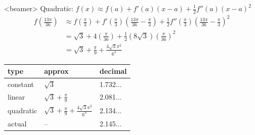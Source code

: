 \begin{frame}<beamer>
\color{answercolor}
Quadratic: $f(x) \approx f(a)+f'(a)(x-a)+\frac12f''(a)(x-a)^2$
\begin{align*}
f\left( \frac{13\pi}{36}\right) &\approx f\left( \frac{\pi}{3}\right)
     +f'\left( \frac{\pi}{3}\right)\left( \frac{13\pi}{36}- \frac{\pi}{3}\right)
+\frac12f''\left( \frac{\pi}{3}\right)\left( \frac{13\pi}{36}- \frac{\pi}{3}\right)^2\\
&=\sqrt 3+4\left(\frac{\pi}{36}\right) +\frac12(8\sqrt 3)\left(\frac{\pi}{36}\right)^2\\
&=\sqrt 3 +\frac{\pi}{9}+\frac{4\sqrt 3 \pi^2}{6^4}
\end{align*}
\begin{center}
\begin{tabular}{l|l|l}
type & approx & decimal \\ \hline
constant & $\sqrt 3$ & 1.732...\\
linear & $\sqrt 3 + \frac{\pi}{9}$ & 2.081... \\
quadratic & $\sqrt 3 + \frac{\pi}{9}+\frac{4\sqrt 3 \pi^2}{6^4}$ & 2.134...\\
\color{W1} actual &\color{W1}  -- &\color{W1}  2.145...
\end{tabular}\end{center}
\end{frame}

